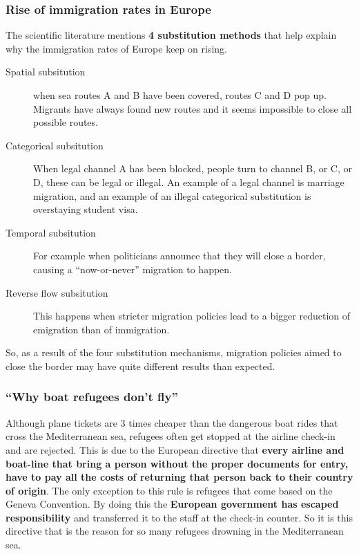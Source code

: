 \documentclass[../summary.tex]{subfiles}
\begin{document}
\subsubsection{Rise of immigration rates in Europe}
The scientific literature mentions \textbf{4 substitution methods} that help explain why the immigration rates of Europe keep on rising.
\begin{description}
	\item[Spatial subsitution] when sea routes A and B have been covered, routes C and D pop up. Migrants have always found new routes and it seems impossible to close all possible routes.
	\item[Categorical subsitution] When legal channel A has been blocked, people turn to channel B, or C, or D, these can be legal or illegal. An example of a legal channel is marriage migration, and an example of an illegal categorical substitution is overstaying student visa.
	\item[Temporal subsitution] For example when politicians announce that they will close a border, causing a ``now-or-never'' migration to happen.
	\item[Reverse flow subsitution] This happens when stricter migration policies lead to a bigger reduction of emigration than of immigration.
\end{description}
So, as a result of the four substitution mechanisms, migration policies aimed to close the border may have quite different results than expected.

\subsubsection{``Why boat refugees don't fly''}
Although plane tickets are 3 times cheaper than the dangerous boat rides that cross the Mediterranean sea, refugees often get stopped at the airline check-in and are rejected. This is due to the European directive that \textbf{every airline and boat-line that bring a person without the proper documents for entry, have to pay all the costs of returning that person back to their country of origin}. The only exception to this rule is refugees that come based on the Geneva Convention. By doing this the \textbf{European government has escaped responsibility }and transferred it to the staff at the check-in counter. So it is this directive that is the reason for so many refugees drowning in the Mediterranean sea.
\end{document}
